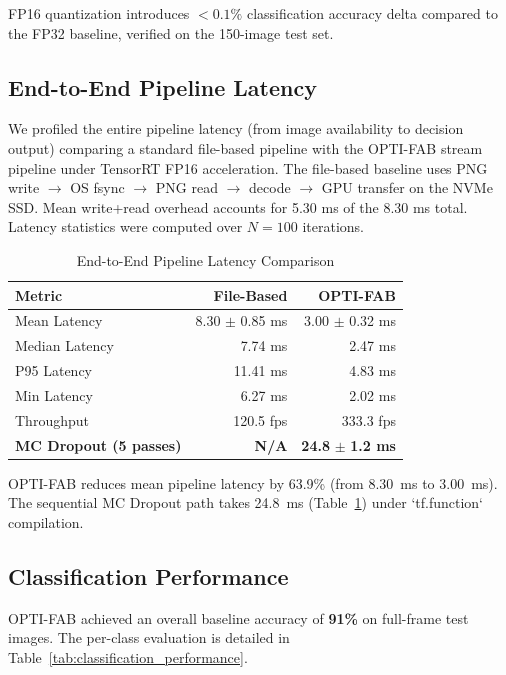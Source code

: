 \documentclass[conference]{IEEEtran}
\begin{document}
FP16 quantization introduces $<0.1\%$ classification accuracy delta compared to the FP32 baseline, verified on the 150-image test set.

\subsection{End-to-End Pipeline Latency}
We profiled the entire pipeline latency (from image availability to decision output) comparing a standard file-based pipeline with the OPTI-FAB stream pipeline under TensorRT FP16 acceleration. The file-based baseline uses PNG write $\rightarrow$ OS fsync $\rightarrow$ PNG read $\rightarrow$ decode $\rightarrow$ GPU transfer on the NVMe SSD. Mean write+read overhead accounts for 5.30 ms of the 8.30 ms total. Latency statistics were computed over $N=100$ iterations.

\begin{table}[h]
\centering
\caption{End-to-End Pipeline Latency Comparison}
\label{tab:pipeline_latency}
\setlength{\tabcolsep}{6pt}
\footnotesize
\begin{tabular}{lrr}
\toprule
\textbf{Metric} & \textbf{File-Based} & \textbf{OPTI-FAB} \\
\midrule
Mean Latency & 8.30 $\pm$ 0.85 ms & 3.00 $\pm$ 0.32 ms \\
Median Latency & 7.74 ms & 2.47 ms \\
P95 Latency & 11.41 ms & 4.83 ms \\
Min Latency & 6.27 ms & 2.02 ms \\
Throughput & 120.5 fps & 333.3 fps \\
\textbf{MC Dropout (5 passes)} & \textbf{N/A} & \textbf{24.8} $\pm$ \textbf{1.2 ms} \\
\bottomrule
\end{tabular}
\end{table}

OPTI-FAB reduces mean pipeline latency by 63.9\% (from 8.30~ms to 3.00~ms). The sequential MC Dropout path takes 24.8~ms (Table~\ref{tab:pipeline_latency}) under `tf.function` compilation.

\subsection{Classification Performance}
OPTI-FAB achieved an overall baseline accuracy of \textbf{91\%} on full-frame test images. The per-class evaluation is detailed in Table~\ref{tab:classification_performance}.
\end{document}
